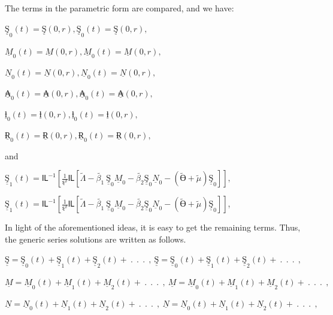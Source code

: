 \documentclass[
]{article}
\begin{document}
The terms in the parametric form are compared, and we have:

\({\underline{Ş}}_{0}(t) = \underline{Ş}(0,r),{\underline{Ş}}_{0}(t) = \underline{Ş}(0,r),\)

\({\underline{M}}_{0}(t) = \underline{M}(0,r),{\underline{M}}_{0}(t) = \underline{M}(0,r),\)

\({\underline{N}}_{0}(t) = \underline{N}(0,r),{\underline{N}}_{0}(t) = \underline{N}(0,r),\)

\({\underline{₳}}_{0}(t) = \underline{₳}(0,r),{\underline{₳}}_{0}(t) = \underline{₳}(0,r),\)

\({\underline{ƚ}}_{0}(t) = \underline{ƚ}(0,r),{\underline{ƚ}}_{0}(t) = \underline{ƚ}(0,r),\)

\({\underline{Ɍ}}_{0}(t) = \underline{Ɍ}(0,r),{\underline{Ɍ}}_{0}(t) = \underline{Ɍ}(0,r),\)

and

\({\underline{Ş}}_{1}(t) = Ỻ^{- 1}\left\lbrack \frac{1}{ȿ^{\vartheta}}Ỻ\left\lbrack \widetilde{\Lambda} - \widetilde{\beta_{1}}\ {\underline{Ş}}_{0}{\underline{M}}_{0} - \widetilde{\beta_{2}}{\underline{Ş}}_{0}{\underline{N}}_{0} - \left( \widetilde{Ө} + \widetilde{\mu} \right){\underline{Ş}}_{0} \right\rbrack \right\rbrack,\)

\({\underline{Ş}}_{1}(t) = Ỻ^{- 1}\left\lbrack \frac{1}{ȿ^{\vartheta}}Ỻ\left\lbrack \widetilde{\Lambda} - \widetilde{\beta_{1}}\ {\underline{Ş}}_{0}{\underline{M}}_{0} - \widetilde{\beta_{2}}{\underline{Ş}}_{0}{\underline{N}}_{0} - \left( \widetilde{Ө} + \widetilde{\mu} \right){\underline{Ş}}_{0} \right\rbrack \right\rbrack\),

In light of the aforementioned ideas, it is easy to get the remaining terms. Thus, the generic series solutions are written as follows.

\(\underline{Ş} = {\underline{Ş}}_{0}(t) + {\underline{Ş}}_{1}(t) + {\underline{Ş}}_{2}(t) + \ .\ \ .\ \ .\ \ ,\ \underline{Ş} = {\underline{Ş}}_{0}(t) + {\underline{Ş}}_{1}(t) + {\underline{Ş}}_{2}(t) + \ .\ \ .\ \ .\ \ ,\)

\(\underline{M} = {\underline{M}}_{0}(t) + {\underline{M}}_{1}(t) + {\underline{M}}_{2}(t) + \ .\ \ .\ \ .\ \ ,\ \underline{M} = {\underline{M}}_{0}(t) + {\underline{M}}_{1}(t) + {\underline{M}}_{2}(t) + \ .\ \ .\ \ .\ \ ,\)

\(\underline{N} = {\underline{N}}_{0}(t) + {\underline{N}}_{1}(t) + {\underline{N}}_{2}(t) + \ .\ \ .\ \ .\ \ ,\ \underline{N} = {\underline{N}}_{0}(t) + {\underline{N}}_{1}(t) + {\underline{N}}_{2}(t) + \ .\ \ .\ \ .\ \ ,\)
\end{document}
